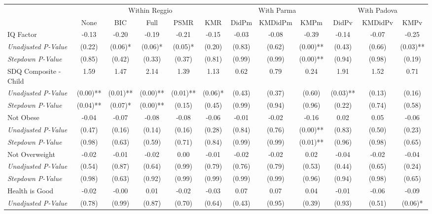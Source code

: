 \begin{tabular}{l c c c c c c c c c c c}
\toprule
& \multicolumn{5}{c}{Within Reggio} & \multicolumn{3}{c}{With Parma} & \multicolumn{3}{c}{With Padova} \\\cmidrule(lr){2-6} \cmidrule(lr){7-9} \cmidrule(lr){10-12}
 & None & BIC & Full & PSMR & KMR & DidPm & KMDidPm & KMPm & DidPv & KMDidPv & KMPv \\
\midrule
IQ Factor & -0.13 & -0.20 & -0.19 & -0.21 & -0.15 & -0.03 & -0.08 & -0.39 & -0.14 & -0.07 & -0.25 \\
\quad \textit{Unadjusted P-Value} & (0.22) & (0.06)* & (0.06)* & (0.05)* & (0.20) & (0.83) & (0.62) & (0.00)** & (0.43) & (0.66) & (0.03)** \\
\quad \textit{Stepdown P-Value} & (0.85) & (0.42) & (0.33) & (0.37) & (0.81) & (0.99) & (0.99) & (0.00)** & (0.94) & (0.98) & (0.19) \\
SDQ Composite - Child & 1.59 & 1.47 & 2.14 & 1.39 & 1.13 & 0.62 & 0.79 & 0.24 & 1.91 & 1.52 & 0.71 \\
\quad \textit{Unadjusted P-Value} & (0.00)** & (0.01)** & (0.00)** & (0.01)** & (0.06)* & (0.43) & (0.37) & (0.60) & (0.03)** & (0.13) & (0.16) \\
\quad \textit{Stepdown P-Value} & (0.04)** & (0.07)* & (0.00)** & (0.15) & (0.45) & (0.99) & (0.94) & (0.96) & (0.22) & (0.74) & (0.58) \\
Not Obese & -0.04 & -0.07 & -0.08 & -0.08 & -0.06 & -0.01 & -0.02 & -0.16 & 0.02 & 0.05 & -0.06 \\
\quad \textit{Unadjusted P-Value} & (0.47) & (0.16) & (0.14) & (0.16) & (0.28) & (0.84) & (0.76) & (0.00)** & (0.83) & (0.50) & (0.23) \\
\quad \textit{Stepdown P-Value} & (0.98) & (0.63) & (0.59) & (0.71) & (0.84) & (0.99) & (0.99) & (0.01)** & (0.96) & (0.98) & (0.65) \\
Not Overweight & -0.02 & -0.01 & -0.02 & 0.00 & -0.01 & -0.02 & -0.02 & 0.02 & -0.04 & -0.02 & -0.04 \\
\quad \textit{Unadjusted P-Value} & (0.54) & (0.87) & (0.64) & (0.99) & (0.79) & (0.76) & (0.79) & (0.53) & (0.44) & (0.65) & (0.24) \\
\quad \textit{Stepdown P-Value} & (0.98) & (0.63) & (0.92) & (0.99) & (0.99) & (0.99) & (0.99) & (0.96) & (0.94) & (0.98) & (0.65) \\
Health is Good & -0.02 & -0.00 & 0.01 & -0.02 & -0.03 & 0.07 & 0.07 & 0.04 & -0.01 & -0.06 & -0.09 \\
\quad \textit{Unadjusted P-Value} & (0.78) & (0.99) & (0.87) & (0.70) & (0.64) & (0.43) & (0.95) & (0.39) & (0.93) & (0.51) & (0.06)* \\

\end{tabular}
